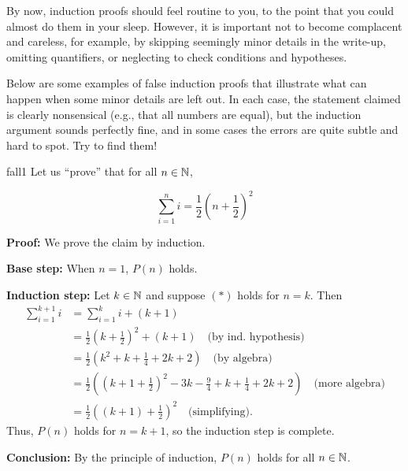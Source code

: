 By now, induction proofs should feel routine to you, to the point that you
could almost do them in your sleep.  However, it is important not to become
complacent and careless, for example, by skipping seemingly minor details in
the write-up, omitting quantifiers, or neglecting to check conditions and
hypotheses. 

Below are some examples of false induction proofs that illustrate what can
happen when some minor details are left out.  In each case, the statement 
claimed is clearly nonsensical (e.g., that all numbers are equal), but the
induction argument sounds perfectly fine, and in some cases the errors are quite
subtle and hard to spot. Try to find them!

\begin{example}{fall1} Let us ``prove'' that for all $n\in\mathbb{N}$,  

\[
\tag{$P(n)$} \sum_{i=1}^n i=\frac12(n+\frac12)^2
\]

\textbf{Proof:} We prove the claim by induction. 

\textbf{Base step:} When $n=1$, $P(n)$ holds.

\textbf{Induction step:} 
Let $k\in\mathbb{N}$ and 
suppose $(*)$ holds for $n=k$. Then
\begin{align*}
\sum_{i=1}^{k+1} i &=\sum_{i=1}^k i + (k+1)
\\
&=\frac12\left(k+\frac12\right)^2+ (k+1)
\quad\text{(by ind. hypothesis)}
\\
&=\frac12\left(k^2+k+\frac14+2k+2\right)
\quad\text{(by algebra)}
\\
&=\frac12\left(\left(k+1+\frac12\right)^2-3k-\frac94 +k+\frac14+2k+2\right)
\quad\text{(more algebra)}
\\
&=\frac12\left((k+1)+\frac12\right)^2
\quad\text{(simplifying).}
\end{align*}
Thus, $P(n)$ holds for $n=k+1$,  so the induction
step is complete.

\textbf{Conclusion:} By the principle of induction, $P(n)$ holds for all
$n\in\mathbb{N}$.
\end{example}

%



